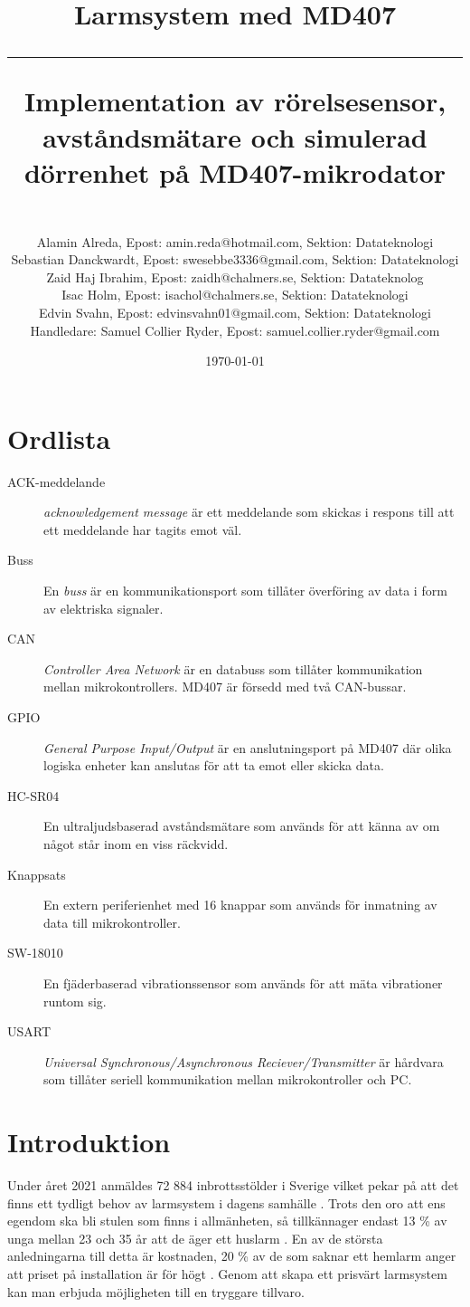 \documentclass{article}
\title{\textbf{Larmsystem med MD407}\\ 
\hspace{10cm}
\hrule
\hspace{10cm}
Implementation av rörelsesensor, avståndsmätare och simulerad dörrenhet på MD407-mikrodator}
\author{\\Alamin Alreda, Epost: amin.reda@hotmail.com, Sektion: Datateknologi \\Sebastian Danckwardt, Epost: swesebbe3336@gmail.com, Sektion: Datateknologi\\Zaid Haj Ibrahim, Epost: zaidh@chalmers.se, Sektion: Datateknolog \\Isac Holm, Epost: isachol@chalmers.se, Sektion: Datateknologi\\Edvin Svahn, Epost: edvinsvahn01@gmail.com, Sektion: Datateknologi\\Handledare: Samuel Collier Ryder, Epost: samuel.collier.ryder@gmail.com}
\date{\today}
\begin{document}
\maketitle
\newpage
\tableofcontents
\newpage
\section*{Ordlista}
\begin{description}

\item[ACK-meddelande] \emph{acknowledgement message} är ett meddelande som skickas i respons till att ett meddelande har tagits emot väl.

\item[Buss] En \emph{buss} är en kommunikationsport som tillåter överföring av data i form av elektriska signaler.

\item[CAN] \emph{Controller Area Network} är en databuss som tillåter kommunikation mellan mikrokontrollers. MD407 är försedd med två CAN-bussar.

\item[GPIO] \emph{General Purpose Input/Output} är en anslutningsport på MD407 där olika logiska enheter kan anslutas för att ta emot eller skicka data.

\item[HC-SR04] En ultraljudsbaserad avståndsmätare som används för att känna av om något står inom en viss  räckvidd. 

\item[Knappsats] En extern periferienhet med 16 knappar som används för inmatning av data till mikrokontroller.

\item[SW-18010] En fjäderbaserad vibrationssensor som används för att mäta vibrationer runtom sig.

\item[USART] \emph{Universal Synchronous/Asynchronous Reciever/Transmitter} är hårdvara som tillåter seriell kommunikation mellan mikrokontroller och PC.

\end{description}
 \newpage

\setcounter{page}{1}
\section{Introduktion}

Under året 2021 anmäldes 72 884 inbrottsstölder i Sverige vilket pekar på att det finns ett tydligt behov av larmsystem i dagens samhälle \cite{BRa}.
Trots den oro att ens egendom ska bli stulen som finns i allmänheten, så tillkännager endast 13 \% av unga mellan 23 och 35 år att de äger ett huslarm \cite{MoFor}.
En av de största anledningarna till detta är kostnaden, 20 \% av de som saknar ett hemlarm anger att priset på installation är för högt \cite{MoFor}.
Genom att skapa ett prisvärt larmsystem kan man erbjuda möjligheten till en tryggare tillvaro.
\end{document}
